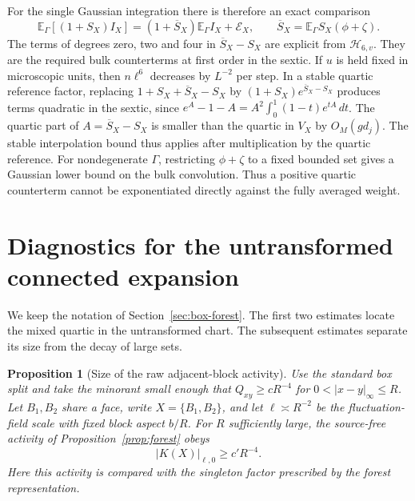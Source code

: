 \documentclass[11pt]{article}
\newtheorem{proposition}{Proposition}[section]
\newcommand{\E}{\mathbb E}
\begin{document}
For the single Gaussian integration there is therefore an exact comparison
\begin{equation}\label{eq:comparison}
 \E_\Gamma[(1+S_X)I_X]=(1+\overline S_X)\E_\Gamma I_X+\mathcal E_X,
 \qquad \overline S_X=\E_\Gamma S_X(\phi+\zeta).
\end{equation}
The terms of degrees zero, two and four in \(\overline S_X-S_X\) are explicit from \(\mathcal H_{6,v}\). They are the required bulk counterterms at first order in the sextic. If \(u\) is held fixed in microscopic units, then \(n\ell^6\) decreases by \(L^{-2}\) per step. In a stable quartic reference factor, replacing \(1+S_X+\overline S_X-S_X\) by \((1+S_X)e^{\overline S_X-S_X}\) produces terms quadratic in the sextic, since \(e^A-1-A=A^2\int_0^1(1-t)e^{tA}\,dt\). The quartic part of \(A=\overline S_X-S_X\) is smaller than the quartic in \(V_X\) by \(O_M(gd_j)\). The stable interpolation bound thus applies after multiplication by the quartic reference. For nondegenerate \(\Gamma\), restricting \(\phi+\zeta\) to a fixed bounded set gives a Gaussian lower bound on the bulk convolution. Thus a positive quartic counterterm cannot be exponentiated directly against the fully averaged weight.


\section{Diagnostics for the untransformed connected expansion}
\label{app:box-raw}
We keep the notation of Section~\ref{sec:box-forest}.
The first two estimates locate the mixed quartic in the
untransformed chart. The subsequent estimates separate its
size from the decay of large sets.

\begin{proposition}[Size of the raw adjacent-block activity]\label{prop:rawforest}
Use the standard box split and take the minorant small enough that
\(Q_{xy}\ge cR^{-4}\) for \(0<|x-y|_\infty\le R\). Let \(B_1,B_2\)
share a face, write \(X=\{B_1,B_2\}\), and let \(\ell\asymp R^{-2}\)
be the fluctuation-field scale with fixed block aspect \(b/R\).
For \(R\) sufficiently large, the source-free activity of
Proposition~\ref{prop:forest} obeys
\[
 |K(X)|_{\ell,0}\ge c'R^{-4}.
\]
Here this activity is compared with the singleton factor prescribed
by the forest representation.
\end{proposition}
\end{document}
